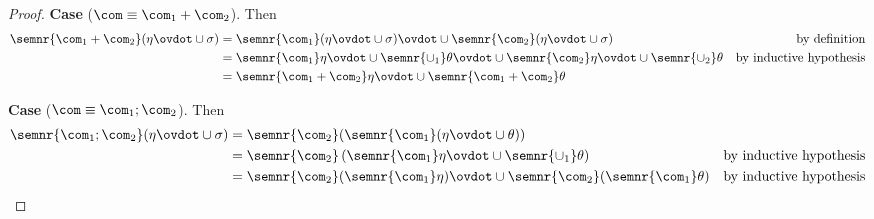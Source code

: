 \begin{proof}


  \medskip 

  \noindent
  \textbf{Case}  (\(\com \equiv \com_1 + \com_2\)).
  Then
  \begin{align*}
    \semnr{\com_1 + \com_2}(\eta \ovdot\cup \sigma) & = \semnr{\com_1}(\eta \ovdot\cup \sigma) \ovdot\cup \semnr{\com_2}(\eta \ovdot\cup \sigma) & \text{by definition}\\
                                                    & = \semnr{\com_1}\eta \ovdot\cup \semnr{\cup_1}\theta \ovdot\cup \semnr{\com_2}\eta \ovdot\cup \semnr{\cup_2}\theta & \text{by inductive hypothesis} \\
                                                    & = \semnr{\com_1 + \com_2}\eta \ovdot\cup \semnr{\com_1 + \com_2}\theta
  \end{align*}

  \medskip

  \noindent
  \textbf{Case}  (\(\com \equiv \com_1 ; \com_2\)).
  Then
  \begin{align*}
    \semnr{\com_1 ; \com_2}(\eta \ovdot\cup \sigma) & = \semnr{\com_2}(\semnr{\com_1}(\eta \ovdot\cup \theta)) \\
                                                    & = \semnr{\com_2}\left(\semnr{\com_1}\eta \ovdot\cup \semnr{\cup_1}\theta\right) & \text{by inductive hypothesis} \\
                                                    & = \semnr{\com_2}(\semnr{\com_1}\eta) \ovdot\cup \semnr{\com_2}(\semnr{\com_1}\theta) & \text{by inductive hypothesis}
  \end{align*}

  \medskip


\end{proof}
